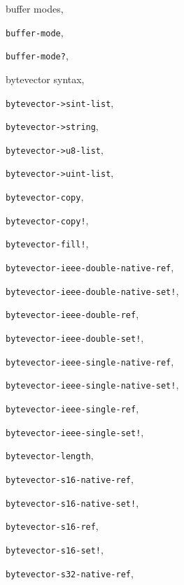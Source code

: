 {\begin{multicols}{2}
buffer modes, \pageref{io_s16}
  
\texttt{buffer-mode}, \textit{\pageref{io_s27}}
  
\texttt{buffer-mode?}, \textit{\pageref{io_s28}}
  
bytevector syntax, \pageref{grammar_s23}
  
\texttt{bytevector-\textgreater{}sint-list}, \textit{\pageref{objects_s260}}
  
\texttt{bytevector-\textgreater{}string}, \textit{\pageref{io_s91}}
  
\texttt{bytevector-\textgreater{}u8-list}, \textit{\pageref{objects_s252}}
  
\texttt{bytevector-\textgreater{}uint-list}, \textit{\pageref{objects_s260}}
  
\texttt{bytevector-copy}, \textit{\pageref{objects_s246}}
  
\texttt{bytevector-copy!}, \textit{\pageref{objects_s247}}
  
\texttt{bytevector-fill!}, \textit{\pageref{objects_s245}}
  
\texttt{bytevector-ieee-double-native-ref}, \textit{\pageref{objects_s262}}
  
\texttt{bytevector-ieee-double-native-set!}, \textit{\pageref{objects_s263}}
  
\texttt{bytevector-ieee-double-ref}, \textit{\pageref{objects_s264}}
  
\texttt{bytevector-ieee-double-set!}, \textit{\pageref{objects_s265}}
  
\texttt{bytevector-ieee-single-native-ref}, \textit{\pageref{objects_s262}}
  
\texttt{bytevector-ieee-single-native-set!}, \textit{\pageref{objects_s263}}
  
\texttt{bytevector-ieee-single-ref}, \textit{\pageref{objects_s264}}
  
\texttt{bytevector-ieee-single-set!}, \textit{\pageref{objects_s265}}
  
\texttt{bytevector-length}, \textit{\pageref{objects_s243}}
  
\texttt{bytevector-s16-native-ref}, \textit{\pageref{objects_s254}}
  
\texttt{bytevector-s16-native-set!}, \textit{\pageref{objects_s255}}
  
\texttt{bytevector-s16-ref}, \textit{\pageref{objects_s256}}
  
\texttt{bytevector-s16-set!}, \textit{\pageref{objects_s257}}
  
\texttt{bytevector-s32-native-ref}, \textit{\pageref{objects_s254}}
  

\end{multicols}}
